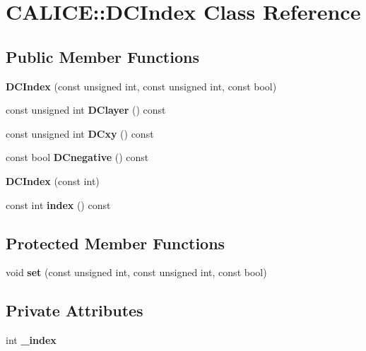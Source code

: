 \section{CALICE::DCIndex Class Reference}
\label{classCALICE_1_1DCIndex}
\subsection*{Public Member Functions}
\begin{DoxyCompactItemize}
\item 
{\bfseries DCIndex} (const unsigned int, const unsigned int, const bool)\label{classCALICE_1_1DCIndex_ad63c29da71e51daf01b7fcd1b5406062}

\item 
const unsigned int {\bfseries DClayer} () const \label{classCALICE_1_1DCIndex_aea8b6f0cca2779514d318bcbd1ef6b7e}

\item 
const unsigned int {\bfseries DCxy} () const \label{classCALICE_1_1DCIndex_a513d6ebf343ab177f8d72ffa17e1fc3b}

\item 
const bool {\bfseries DCnegative} () const \label{classCALICE_1_1DCIndex_a6b0d5449c8e6c7d707e12e4e5ef65c81}

\item 
{\bfseries DCIndex} (const int)\label{classCALICE_1_1DCIndex_accc05b44244c93a41c9213d1e007c7e3}

\item 
const int {\bfseries index} () const \label{classCALICE_1_1DCIndex_a8133a5fb0d7ee839533f9130af9a16ed}

\end{DoxyCompactItemize}
\subsection*{Protected Member Functions}
\begin{DoxyCompactItemize}
\item 
void {\bfseries set} (const unsigned int, const unsigned int, const bool)\label{classCALICE_1_1DCIndex_a20505a45223c4772c74ff7b6969ba7b4}

\end{DoxyCompactItemize}
\subsection*{Private Attributes}
\begin{DoxyCompactItemize}
\item 
int {\bfseries \_\-index}\label{classCALICE_1_1DCIndex_af8b745008558ed0c6d90cdaba50da47f}

\end{DoxyCompactItemize}
